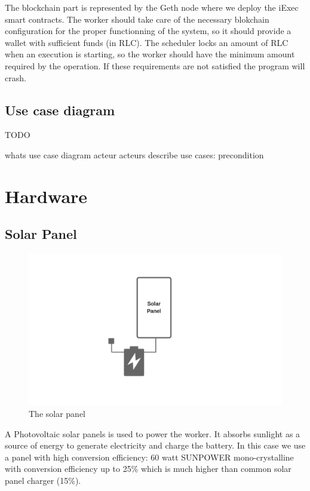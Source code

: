         The blockchain part is represented by the Geth node where we deploy the iExec smart contracts.
        The worker should take care of the necessary blokchain configuration for the proper functionning
        of the system, so it should provide a wallet with sufficient funds (in RLC). The scheduler locks
        an amount of RLC when an execution is starting, so the worker should have the minimum amount
        required by the operation. If these requirements are not satisfied the program will crash.

    \subsection{Use case diagram}
    TODO

    whats use case diagram acteur 
    acteurs
    describe use cases: precondition

\section{Hardware}

    \subsection{Solar Panel}

        \begin{figure}[!h]\centering
            \includegraphics[width=.6\columnwidth]{5-Design/figs/solar-panel.png}
            \caption{The solar panel}
        \end{figure}

        A Photovoltaic solar panels is used to power the worker. It absorbs sunlight as a source of energy to
        generate electricity and charge the battery. In this case we use a panel with high conversion
        efficiency: 60 watt SUNPOWER mono-crystalline with conversion efficiency up to 25\% which is much
        higher than common solar panel charger (15\%).

